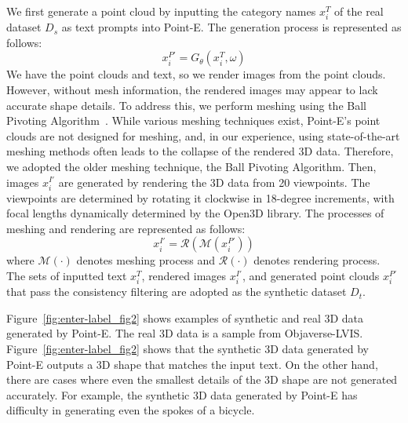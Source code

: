 We first generate a point cloud by inputting the category names $x_{i}^{T}$ of the real dataset $D_s$ as text prompts into Point-E.
The generation process is represented as follows:
\begin{equation}
    x_{i}^{P \prime} = G_\theta \left( x_{i}^{T}, \omega \right)
\end{equation}
We have the point clouds and text, so we render images from the point clouds. However, without mesh information, the rendered images may appear to lack accurate shape details. To address this, we perform meshing using the Ball Pivoting Algorithm~\cite{bernardini1999ball}.
While various meshing techniques exist, Point-E's point clouds are not designed for meshing, and, in our experience, using state-of-the-art meshing methods often leads to the collapse of the rendered 3D data. Therefore, we adopted the older meshing technique, the Ball Pivoting Algorithm.
Then, images $x_{i}^{I \prime}$ are generated by rendering the 3D data from 20 viewpoints.
The viewpoints are determined by rotating it clockwise in 18-degree increments, with focal lengths dynamically determined by the Open3D library.
The processes of meshing and rendering are represented as follows:
\begin{equation}
    x_{i}^{I \prime}= \mathcal{R}(\mathcal{M}(x_{i}^{P \prime}))
\end{equation}
where $\mathcal{M}(\cdot)$ denotes meshing process and $\mathcal{R}(\cdot)$ denotes rendering process.
The sets of inputted text $x_{i}^{T}$, rendered images $x_{i}^{I \prime}$, and generated point clouds $x_{i}^{P \prime}$ that pass the consistency filtering are adopted as the synthetic dataset $D_t$.

Figure~\ref{fig:enter-label_fig2} shows examples of synthetic and real 3D data generated by Point-E. The real 3D data is a sample from Objaverse-LVIS. Figure~\ref{fig:enter-label_fig2} shows that the synthetic 3D data generated by Point-E outputs a 3D shape that matches the input text. On the other hand, there are cases where even the smallest details of the 3D shape are not generated accurately. For example, the synthetic 3D data generated by Point-E has difficulty in generating even the spokes of a bicycle.

